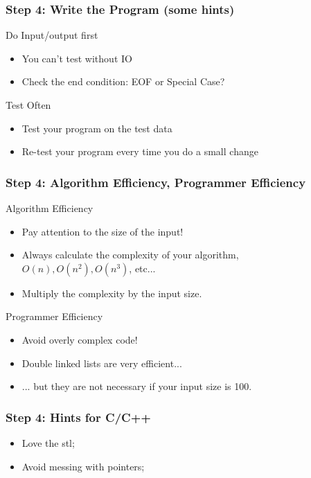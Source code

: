 \documentclass{beamer}
\begin{document}
\begin{frame}
  \frametitle{Step 4: Write the Program (some hints)}

  \begin{block}{Do Input/output first}
    \begin{itemize}
    \item You can't test without IO
    \item Check the end condition: EOF or Special Case?
    \end{itemize}
  \end{block}

  \begin{block}{Test Often}
    \begin{itemize}
    \item Test your program on the test data
    \item Re-test your program every time you do a small change
    \end{itemize}    
  \end{block}
\end{frame}

\begin{frame}
  \frametitle{Step 4: Algorithm Efficiency, Programmer Efficiency}

  \begin{block}{Algorithm Efficiency}
    \begin{itemize}
      \item Pay attention to the size of the input!
      \item Always calculate the complexity of your algorithm,\\
        $O(n), O(n^2), O(n^3)$, etc...
      \item Multiply the complexity by the input size.
    \end{itemize}
  \end{block}

  \begin{block}{Programmer Efficiency}
    \begin{itemize}
    \item Avoid overly complex code!
    \item Double linked lists are very efficient...
    \item ... but they are not necessary if your input size is 100.
    \end{itemize}
  \end{block}
\end{frame}

\begin{frame}
  \frametitle{Step 4: Hints for C/C++}
  \begin{itemize}
  \item Love the stl;
    \vspace {.5 cm}
  \item Avoid messing with pointers;
    \vspace {.5 cm}
  \end{itemize}
\end{frame}
\end{document}
